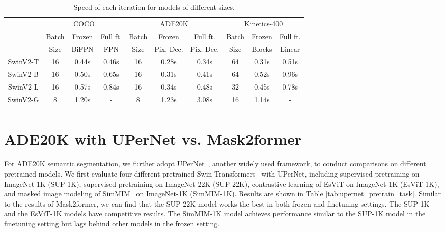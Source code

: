 \documentclass{article}
\begin{document}
\begin{table}[htb]
        \centering
        \small
        \addtolength{\tabcolsep}{-2.5pt}
        \begin{tabular}{c|ccc|ccc|ccc}
            \Xhline{1.0pt}
            \multirow{3}{*}{Base Network} & \multicolumn{3}{c|}{COCO} & \multicolumn{3}{c|}{ADE20K} & \multicolumn{3}{c}{Kinetics-400}\\
            & Batch & Frozen & Full ft. & Batch & Frozen & Full ft. & Batch & Frozen & Full ft. \\
            & Size &  BiFPN & FPN & Size &  Pix. Dec. &  Pix. Dec. & Size &   Blocks & Linear \\
            \hline
            SwinV2-T & 16 & 0.44s & 0.46s & 16 & 0.28s & 0.34s & 64 & 0.31s & 0.51s \\
            SwinV2-B & 16 & 0.50s & 0.65s & 16 & 0.31s & 0.41s & 64 & 0.52s & 0.96s \\
            SwinV2-L & 16 & 0.57s & 0.84s & 16 & 0.34s & 0.48s & 32 & 0.45s & 0.78s \\
            SwinV2-G & 8 & 1.20s & - & 8 & 1.23s & 3.08s & 16 & 1.14s & - \\
          \Xhline{1.0pt}  
       \end{tabular}
     \caption{Speed of each iteration for models of different sizes.}
     \label{tab:speed}
\end{table}

\section{ADE20K with UPerNet vs. Mask2former}

For ADE20K semantic segmentation, we further adopt UPerNet~\cite{xiao2018upernet}, another widely used framework, to conduct comparisons on different pretrained models.
We first evaluate four different pretrained Swin Transformers~\cite{liu2021swin} with UPerNet, including supervised pretraining on ImageNet-1K (SUP-1K), supervised pretraining on ImageNet-22K (SUP-22K), contrastive learning of EsViT\cite{esvit} on ImageNet-1K (EsViT-1K), and masked image modeling of SimMIM~\cite{xie2021simmim} on ImageNet-1K (SimMIM-1K). 
Results are shown in Table \ref{tab:upernet_pretrain_task}. Similar to the results of Mask2former, we can find that the SUP-22K model works the best in both frozen and finetuning settings. The SUP-1K and the EsViT-1K models have competitive results. The SimMIM-1K model achieves performance similar to the SUP-1K model in the finetuning setting but lags behind other models in the frozen setting.
\end{document}

